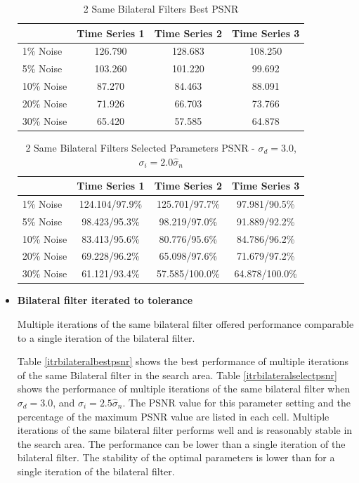 \documentclass[11pt]{article}
\theoremstyle{definition}
\begin{document}
\begin{itemize}
\begin{table}[!h]
\small
\begin{center}
\begin{tabular}{lccc}
\hline 
 & Time Series 1 & Time Series 2 & Time Series 3 \\ \hline
1\% Noise & 126.790 & 128.683 & 108.250 \\ \hline
5\% Noise & 103.260 & 101.220 & 99.692 \\ \hline
10\% Noise & 87.270 & 84.463 & 88.091 \\ \hline
20\% Noise & 71.926 & 66.703 & 73.766 \\ \hline
30\% Noise & 65.420 & 57.585 & 64.878 \\ \hline
\end{tabular}
\caption{2 Same Bilateral Filters Best PSNR}
\label{2samebilateralbestpsnr}
\end{center}
\end{table}

\begin{table}[!h]
\small
\begin{center}
\begin{tabular}{lccc}
\hline 
 & Time Series 1 & Time Series 2 & Time Series 3 \\ \hline
1\% Noise & 124.104/97.9\% & 125.701/97.7\% & 97.981/90.5\% \\ \hline
5\% Noise & 98.423/95.3\% & 98.219/97.0\% & 91.889/92.2\% \\ \hline
10\% Noise & 83.413/95.6\% & 80.776/95.6\% & 84.786/96.2\% \\ \hline
20\% Noise & 69.228/96.2\% & 65.098/97.6\% & 71.679/97.2\% \\ \hline
30\% Noise & 61.121/93.4\% & 57.585/100.0\% & 64.878/100.0\% \\ \hline 
\end{tabular}
\caption{2 Same Bilateral Filters Selected Parameters PSNR - $\sigma_d = 3.0$, $\sigma_i = 2.0 \hat{\sigma}_n$}
\label{2samebilateralselectpsnr}
\end{center}
\end{table}

\item \textbf{Bilateral filter iterated to tolerance} 

  Multiple iterations of the same bilateral filter offered performance
  comparable to a single iteration of the bilateral filter.

  Table \ref{itrbilateralbestpsnr} shows the best performance of
  multiple iterations of the same Bilateral filter in the search area.
  Table \ref{itrbilateralselectpsnr} shows the performance of multiple
  iterations of the same bilateral filter when $\sigma_d = 3.0$, and
  $\sigma_i = 2.5 \hat{\sigma}_n$. The PSNR value for this parameter
  setting and the percentage of the maximum PSNR value are listed in
  each cell. Multiple iterations of the same bilateral filter performs well
  and is reasonably stable in the search area. The performance can be
  lower than a single iteration of the bilateral filter. The stability
  of the optimal parameters is lower than for a single iteration of
  the bilateral filter.


\end{itemize}
\end{document}

